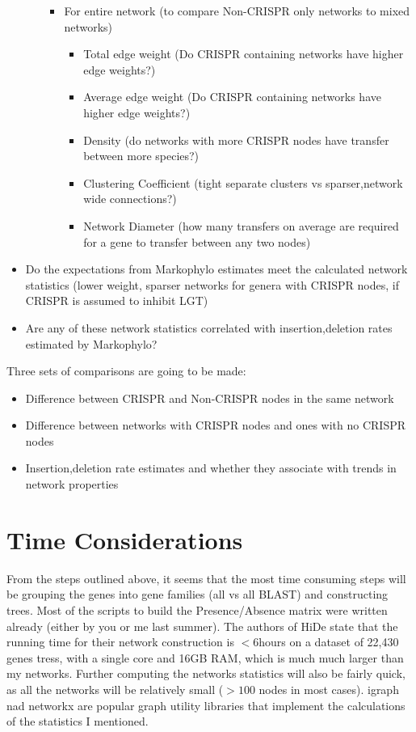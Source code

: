 \documentclass[12pt,letter]{article}
\begin{document}
\begin{itemize}
\begin{itemize}
\begin{itemize}
\begin{itemize}
            \end{itemize}
            \item For entire network (to compare Non-CRISPR only networks to mixed networks)
            \begin{itemize}
                \item Total edge weight (Do CRISPR containing networks have higher edge weights?)
                \item Average edge weight (Do CRISPR containing networks have higher edge weights?)
                \item Density (do networks with more CRISPR nodes have transfer between more species?)
                \item Clustering Coefficient (tight separate clusters vs sparser,network wide connections?)
                \item Network Diameter (how many transfers on average are required for a gene to transfer between any two nodes)
            \end{itemize}
        \end{itemize}
    \end{itemize}
    \item Do the expectations from Markophylo estimates meet the calculated network statistics (lower weight, sparser networks for genera with CRISPR nodes, if CRISPR is assumed to inhibit LGT)
    \item Are any of these network statistics correlated with insertion,deletion rates estimated by Markophylo?
\end{itemize}
Three sets of comparisons are going to be made:
\begin{itemize}
    \item Difference between CRISPR and Non-CRISPR nodes in the same network
    \item Difference between networks with CRISPR nodes and ones with no CRISPR nodes
    \item Insertion,deletion rate estimates and whether they associate with trends in network properties
\end{itemize}
\section*{Time Considerations}
From the steps outlined above, it seems that the most time consuming steps will be grouping the genes into gene families (all vs all BLAST) and constructing trees. Most of the scripts to build the Presence/Absence matrix were written already (either by you or me last summer). The authors of HiDe state that the running time for their network construction is $< 6$hours on a dataset of 22,430 genes tress, with a single core and 16GB RAM, which is much much larger than my networks. Further computing the networks statistics will also be fairly quick, as all the networks will be relatively small ($> 100$ nodes in most cases). igraph nad networkx are popular graph utility libraries that implement the calculations of the statistics I mentioned.
\end{document}
